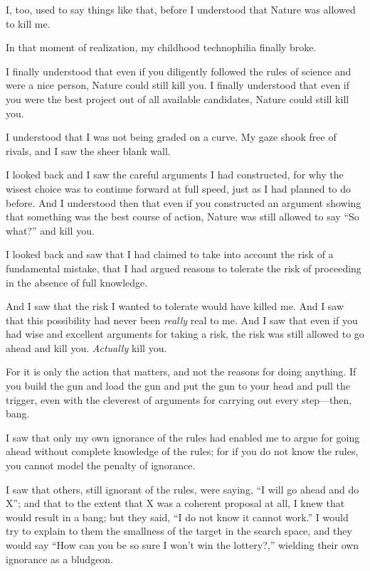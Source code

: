 {
 I, too, used to say things like that, before I understood that
Nature was allowed to kill me.}

{
 In that moment of realization, my childhood technophilia finally
broke.}

{
 I finally understood that even if you diligently followed the
rules of science and were a nice person, Nature could still kill you. I
finally understood that even if you were the best project out of all
available candidates, Nature could still kill you.}

{
 I understood that I was not being graded on a curve. My gaze shook
free of rivals, and I saw the sheer blank wall.}

{
 I looked back and I saw the careful arguments I had constructed,
for why the wisest choice was to continue forward at full speed, just
as I had planned to do before. And I understood then that even if you
constructed an argument showing that something was the best course of
action, Nature was still allowed to say ``So
what?'' and kill you.}

{
 I looked back and saw that I had claimed to take into account the
risk of a fundamental mistake, that I had argued reasons to tolerate
the risk of proceeding in the absence of full knowledge.}

{
 And I saw that the risk I wanted to tolerate would have killed me.
And I saw that this possibility had never been \textit{really} real to
me. And I saw that even if you had wise and excellent arguments for
taking a risk, the risk was still allowed to go ahead and kill you.
\textit{Actually} kill you.}

{
 For it is only the action that matters, and not the reasons for
doing anything. If you build the gun and load the gun and put the gun
to your head and pull the trigger, even with the cleverest of arguments
for carrying out every step---then, bang.}

{
 I saw that only my own ignorance of the rules had enabled me to
argue for going ahead without complete knowledge of the rules; for if
you do not know the rules, you cannot model the penalty of ignorance.}

{
 I saw that others, still ignorant of the rules, were saying,
``I will go ahead and do X''; and
that to the extent that X was a coherent proposal at all, I knew that
would result in a bang; but they said, ``I do not know
it cannot work.'' I would try to explain to them the
smallness of the target in the search space, and they would say
``How can you be so sure I won't win
the lottery?,'' wielding their own ignorance as a
bludgeon.}

